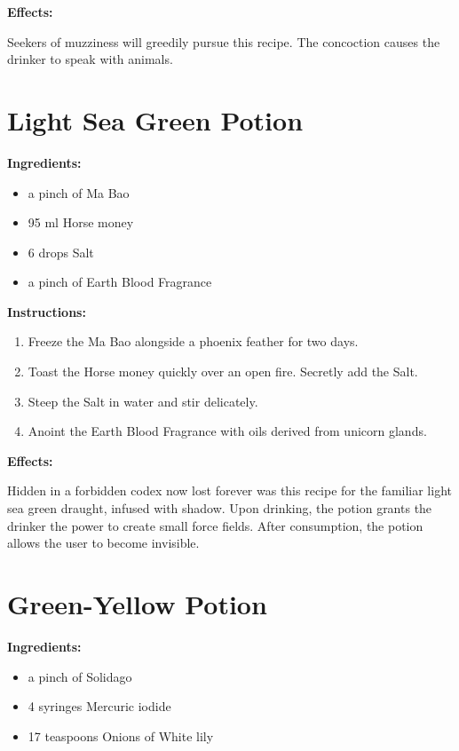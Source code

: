 \documentclass{article}
\begin{document}
\textbf{Effects:}

Seekers of muzziness will greedily pursue this recipe. The concoction causes the drinker to speak with animals.

\newpage
\section*{Light Sea Green Potion}

\textbf{Ingredients:}

\begin{itemize}
  \item a pinch of Ma Bao
  \item 95 ml Horse money
  \item 6 drops Salt
  \item a pinch of Earth Blood Fragrance
\end{itemize}

\textbf{Instructions:}

\begin{enumerate}
  \item Freeze the Ma Bao alongside a phoenix feather for two days.
  \item Toast the Horse money quickly over an open fire. Secretly add the Salt.
  \item Steep the Salt in water and stir delicately.
  \item Anoint the Earth Blood Fragrance with oils derived from unicorn glands.
\end{enumerate}

\textbf{Effects:}

Hidden in a forbidden codex now lost forever was this recipe for the familiar light sea green draught, infused with shadow. Upon drinking, the potion grants the drinker the power to create small force fields. After consumption, the potion allows the user to become invisible.

\newpage
\section*{Green-Yellow Potion}

\textbf{Ingredients:}

\begin{itemize}
  \item a pinch of Solidago
  \item 4 syringes Mercuric iodide
  \item 17 teaspoons Onions of White lily
\end{itemize}
\end{document}
